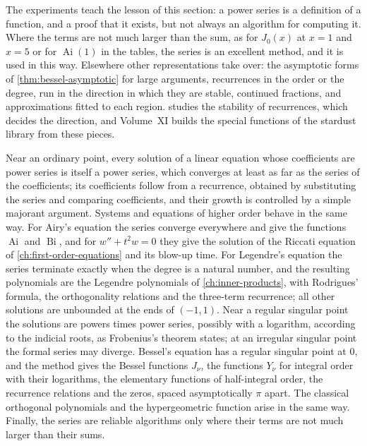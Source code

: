 The experiments teach the lesson of this section: a power series is a definition of a function, and a proof that it exists, but not always an algorithm for computing it. Where the terms are not much larger than the sum, as for $J_0(x)$ at $x=1$ and $x=5$ or for $\operatorname{Ai}(1)$ in the tables, the series is an excellent method, and it is used in this way. Elsewhere other representations take over: the asymptotic forms of \cref{thm:bessel-asymptotic} for large arguments, recurrences in the order or the degree, run in the direction in which they are stable, continued fractions, and approximations fitted to each region.  studies the stability of recurrences, which decides the direction, and Volume~XI builds the special functions of the stardust library from these pieces.

\bigskip
Near an ordinary point, every solution of a linear equation whose coefficients are power series is itself a power series, which converges at least as far as the series of the coefficients; its coefficients follow from a recurrence, obtained by substituting the series and comparing coefficients, and their growth is controlled by a simple majorant argument. Systems and equations of higher order behave in the same way. For Airy's equation the series converge everywhere and give the functions $\operatorname{Ai}$ and $\operatorname{Bi}$, and for $w''+t^2w=0$ they give the solution of the Riccati equation of \cref{ch:first-order-equations} and its blow-up time. For Legendre's equation the series terminate exactly when the degree is a natural number, and the resulting polynomials are the Legendre polynomials of \cref{ch:inner-products}, with Rodrigues' formula, the orthogonality relations and the three-term recurrence; all other solutions are unbounded at the ends of $(-1,1)$. Near a regular singular point the solutions are powers times power series, possibly with a logarithm, according to the indicial roots, as Frobenius's theorem states; at an irregular singular point the formal series may diverge. Bessel's equation has a regular singular point at $0$, and the method gives the Bessel functions $J_\nu$, the functions $Y_\nu$ for integral order with their logarithms, the elementary functions of half-integral order, the recurrence relations and the zeros, spaced asymptotically $\pi$ apart. The classical orthogonal polynomials and the hypergeometric function arise in the same way. Finally, the series are reliable algorithms only where their terms are not much larger than their sums.

